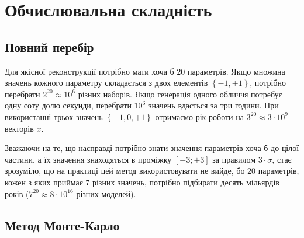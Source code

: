 \section{Обчислювальна складність}

\vspace{-\baselineskip}

\subsection{Повний перебір}

Для якісної реконструкції потрібно мати хоча б $20$ параметрів.
Якщо множина значень кожного параметру складається з двох елементів
$\left\{ -1, +1 \right\}$,
потрібно перебрати $2^{20} \approx 10^6$ різних наборів.
Якщо генерація одного обличчя потребує одну соту долю секунди,
перебрати $10^6$ значень вдасться за три години.
При використанні трьох значень $\left\{ -1, 0, +1 \right\}$
отримаємо рік роботи на $3^{20} \approx 3 \cdot 10^9$ векторів $x$.

Зважаючи на те,
що насправді потрібно знати значення параметрів хоча б до цілої частини,
а їх значення знаходяться в проміжку
$\left[ -3; +3 \right]$ за правилом $3 \cdot \sigma$,
стає зрозуміло, що на практиці цей метод використовувати не вийде,
бо $20$ параметрів, кожен з яких приймає $7$ різних значень,
потрібно підбирати десять мільярдів років
($7^{20} \approx 8 \cdot 10^{16}$ різних моделей).

\subsection{Метод Монте-Карло}

